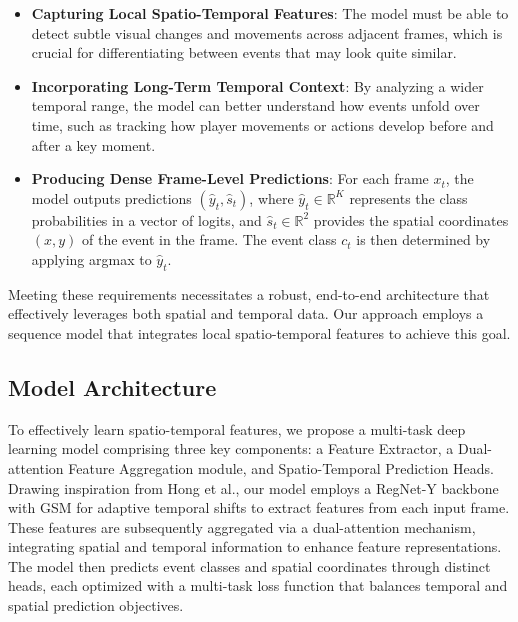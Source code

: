 \documentclass[conference]{IEEEtran}
\begin{document}
\begin{itemize}
    \item \textbf{Capturing Local Spatio-Temporal Features}: The model must be able to detect subtle visual changes and movements across adjacent frames, which is crucial for differentiating between events that may look quite similar.
    \item \textbf{Incorporating Long-Term Temporal Context}: By analyzing a wider temporal range, the model can better understand how events unfold over time, such as tracking how player movements or actions develop before and after a key moment.
    \item \textbf{Producing Dense Frame-Level Predictions}: For each frame \(x_t\), the model outputs predictions \((\hat{y}_t, \hat{s}_t)\), where \(\hat{y}_t \in \mathbb{R}^K\) represents the class probabilities in a vector of logits, and \(\hat{s}_t \in \mathbb{R}^2\) provides the spatial coordinates \((x, y)\) of the event in the frame. The event class \(c_t\) is then determined by applying argmax to \(\hat{y}_t\).
\end{itemize}

Meeting these requirements necessitates a robust, end-to-end architecture that effectively leverages both spatial and temporal data. Our approach employs a sequence model that integrates local spatio-temporal features to achieve this goal.


\subsection{Model Architecture}
To effectively learn spatio-temporal features, we propose a multi-task deep learning model comprising three key components: a Feature Extractor, a Dual-attention Feature Aggregation module, and Spatio-Temporal Prediction Heads. Drawing inspiration from Hong et al.\cite{spot22}, our model employs a RegNet-Y backbone \cite{radosavovic2020designingnetworkdesignspaces} with GSM \cite{9156729} for adaptive temporal shifts to extract features from each input frame. These features are subsequently aggregated via a dual-attention mechanism, integrating spatial and temporal information to enhance feature representations. The model then predicts event classes and spatial coordinates through distinct heads, each optimized with a multi-task loss function that balances temporal and spatial prediction objectives.

\end{document}
